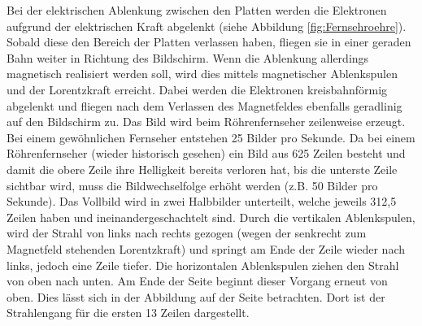 Bei der elektrischen Ablenkung zwischen den Platten werden die Elektronen aufgrund der elektrischen Kraft abgelenkt (siehe Abbildung \ref{fig:Fernsehroehre}).
Sobald diese den Bereich der Platten verlassen haben, fliegen sie in einer geraden Bahn weiter in Richtung des Bildschirm.
Wenn die Ablenkung allerdings magnetisch realisiert werden soll, wird dies mittels magnetischer Ablenkspulen und der Lorentzkraft erreicht.
Dabei werden die Elektronen kreisbahnförmig abgelenkt und fliegen nach dem Verlassen des Magnetfeldes ebenfalls geradlinig auf den Bildschirm zu.
Das Bild wird beim Röhrenfernseher zeilenweise erzeugt.
Bei einem gewöhnlichen Fernseher entstehen 25 Bilder pro Sekunde.
Da bei einem Röhrenfernseher (wieder historisch gesehen) ein Bild aus 625 Zeilen besteht und damit die obere Zeile ihre Helligkeit bereits verloren hat, bis die unterste Zeile sichtbar wird, muss die Bildwechselfolge erhöht werden (z.B. 50 Bilder pro Sekunde).
Das Vollbild wird in zwei Halbbilder unterteilt, welche jeweils 312,5 Zeilen haben und ineinandergeschachtelt sind.
Durch die vertikalen Ablenkspulen, wird der Strahl von links nach rechts gezogen (wegen der senkrecht zum Magnetfeld stehenden Lorentzkraft) und springt am Ende der Zeile wieder nach links, jedoch eine Zeile tiefer.
Die horizontalen Ablenkspulen ziehen den Strahl von oben nach  unten.
Am Ende der Seite beginnt dieser Vorgang erneut von oben.
Dies lässt sich in der Abbildung auf der Seite \cite{Roehrenfernsehr} betrachten.
Dort ist der Strahlengang für die ersten 13 Zeilen dargestellt.

